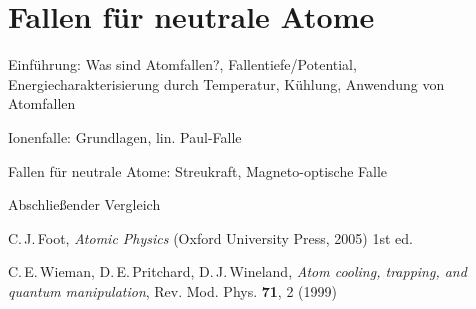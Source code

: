 \documentclass[twocolumn]{revtex4}
\begin{document}
\section{Fallen für neutrale Atome}

Einführung: Was sind Atomfallen?, Fallentiefe/Potential, Energiecharakterisierung durch Temperatur, Kühlung, Anwendung von Atomfallen

Ionenfalle: Grundlagen, lin. Paul-Falle

Fallen für neutrale Atome: Streukraft, Magneto-optische Falle

Abschließender Vergleich


\begin{thebibliography}{}
C.\,J.\,Foot, {\it Atomic Physics} (Oxford University Press, 2005) 1st ed.

C.\,E.\,Wieman, D.\,E.\,Pritchard, D.\,J.\,Wineland, {\it Atom cooling, trapping, and quantum manipulation}, Rev. Mod. Phys. \textbf{71}, 2 (1999)

\end{thebibliography}
\end{document}
